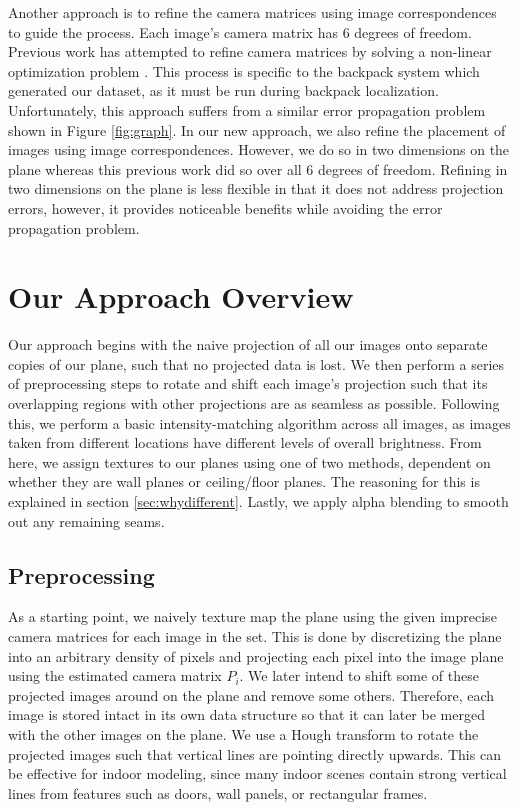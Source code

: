 \documentclass[10pt,twocolumn,letterpaper]{article}
\begin{document}
Another approach is to refine the camera matrices using image
correspondences to guide the process. Each image's camera matrix has 6 degrees of freedom. Previous work has attempted to refine
camera matrices by solving a non-linear optimization problem
\cite{liu2010indoor}. This process is specific to the backpack system
which generated our dataset, as it must be run during backpack
localization\cite{liu2010indoor,chen2010indoor}. Unfortunately, this
approach suffers from a similar error propagation problem shown in
Figure \ref{fig:graph}. In our new approach, we also refine the
placement of images using image correspondences. However, we do so in
two dimensions on the plane whereas this previous work did so over all
6 degrees of freedom. Refining in two dimensions on the plane is less
flexible in that it does not address projection errors, however, it
provides noticeable benefits while avoiding the error propagation
problem.


\section{Our Approach Overview}
Our approach begins with the naive projection of all our images onto separate copies of our plane, such that no projected data is lost. We then perform a series of preprocessing steps to rotate and shift each image's projection such that its overlapping regions with other projections are as seamless as possible. Following this, we perform a basic intensity-matching algorithm across all images, as images taken from different locations have different levels of overall brightness. From here, we assign textures to our planes using one of two methods, dependent on whether they are wall planes or ceiling/floor planes. The reasoning for this is explained in section \ref{sec:whydifferent}. Lastly, we apply alpha blending to smooth out any remaining seams.

\subsection{Preprocessing}
As a starting point, we naively texture map the plane using the given imprecise camera matrices for each image in the set. This is done by discretizing the plane into an arbitrary density of pixels and projecting each pixel into the image plane using the estimated camera matrix $P_i$. We later intend to shift some of these projected images around on the plane and remove some others. Therefore, each image is stored intact in its own data structure so that it can later be merged with the other images on the plane. We use a Hough transform to rotate the projected images such that vertical lines are pointing directly upwards. This can be effective for indoor modeling, since many indoor scenes contain strong vertical lines from features such as doors, wall panels, or rectangular frames. 
\end{document}
